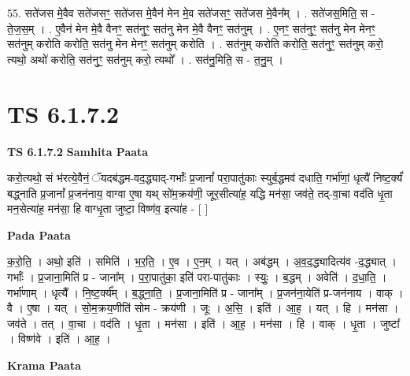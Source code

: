 \documentclass[17pt]{extarticle}
\begin{document}
55. सते॑जस मे॒वैव सते॑जसꣳ॒॒ सते॑जस मे॒वैन॑ मेन मे॒व सते॑जसꣳ॒॒ सते॑जस मे॒वैन᳚म् । . सते॑जस॒मिति॒ स - ते॒ज॒स॒म् । . ए॒वैन॑ मेन मे॒वै वैनꣳ॒॒ सत॑नुꣳ॒॒ सत॑नु मेन मे॒वै वैनꣳ॒॒ सत॑नुम् । . ए॒नꣳ॒॒ सत॑नुꣳ॒॒ सत॑नु मेन मेनꣳ॒॒ सत॑नुम् करोति करोति॒ सत॑नु मेन मेनꣳ॒॒ सत॑नुम् करोति । . सत॑नुम् करोति करोति॒ सत॑नुꣳ॒॒ सत॑नुम् करो॒ त्यथो॒ अथो॑ करोति॒ सत॑नुꣳ॒॒ सत॑नुम् करो॒ त्यथो᳚ । . सत॑नु॒मिति॒ स - त॒नु॒म् । \newline
\pagebreak
{}

\section{ TS 6.1.7.2 }

\textbf{TS 6.1.7.2 } \newline
\textbf{Samhita Paata} \newline

करो॒त्यथो॒ सं भ॑रत्ये॒वैनं॒ ॅयदब॑द्धम-वद॒द्ध्याद्-गर्भाः᳚ प्र॒जानां᳚ परा॒पातु॑काः स्युर्ब॒द्धमव॑ दधाति॒ गर्भा॑णां॒ धृत्यै॑ निष्ट॒र्क्यं॑ बद्ध्नाति प्र॒जानां᳚ प्र॒जन॑नाय॒ वाग्वा ए॒षा यथ् सो॑म॒क्रय॑णी॒ जूर॒सीत्या॑ह॒ यद्धि मन॑सा॒ जव॑ते॒ तद्-वा॒चा वद॑ति धृ॒ता मन॒सेत्या॑ह॒ मन॑सा॒ हि वाग्धृ॒ता जुष्टा॒ विष्ण॑व॒ इत्या॑ह - [  ] \newline

\textbf{Pada Paata} \newline

क॒रो॒ति॒ । अथो॒ इति॑ । समिति॑ । भ॒र॒ति॒ । ए॒व । ए॒न॒म् । यत् । अब॑द्धम् । अ॒व॒द॒द्ध्यादित्य॑व -द॒द्ध्यात् । गर्भाः᳚ । प्र॒जाना॒मिति॑ प्र - जाना᳚म् । प॒रा॒पातु॑का॒ इति॑ परा-पातु॑काः । स्युः॒ । ब॒द्धम् । अवेति॑ । द॒धा॒ति॒ । गर्भा॑णाम् । धृत्यै᳚ । नि॒ष्ट॒र्क्य᳚म् । ब॒द्ध्ना॒ति॒ । प्र॒जाना॒मिति॑ प्र - जाना᳚म् । प्र॒जन॑ना॒येति॑ प्र-जन॑नाय । वाक् । वै । ए॒षा । यत् । सो॒म॒क्रय॒णीति॑ सोम - क्रय॑णी । जूः । अ॒सि॒ । इति॑ । आ॒ह॒ । यत् । हि । मन॑सा । जव॑ते । तत् । वा॒चा । वद॑ति । धृ॒ता । मन॑सा । इति॑ । आ॒ह॒ । मन॑सा । हि । वाक् । धृ॒ता । जुष्टा᳚ । विष्ण॑वे । इति॑ । आ॒ह॒ ।  \newline


\textbf{Krama Paata} \newline
\end{document}
